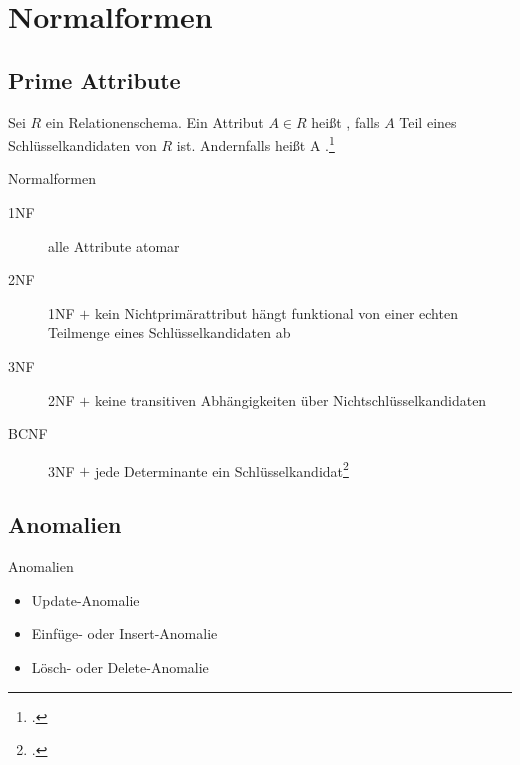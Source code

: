 \documentclass{lehramt-informatik-haupt}
\begin{document}
\let\ah=\liAttributHuelle
\let\m=\liAttributMenge
\let\FA=\liFunktionaleAbhaengigkeiten
\let\fa=\liFunktionaleAbhaengigkeit


\chapter{Normalformen}

\section{Prime Attribute}

Sei $R$ ein Relationenschema. Ein Attribut $A \in R$ heißt ,
falls $A$ Teil eines Schlüsselkandidaten von $R$ ist. Andernfalls heißt
A .\footcite[Seite 191]{winter}

\begin{liLernkartei}{Normalformen}
\begin{description}
\item[1NF] alle Attribute atomar

\item[2NF] 1NF $+$ kein Nichtprimärattribut hängt funktional von einer
echten Teilmenge eines Schlüsselkandidaten ab

\item[3NF] 2NF $+$ keine transitiven Abhängigkeiten über
Nichtschlüsselkandidaten

\item[BCNF] 3NF $+$ jede Determinante ein Schlüsselkandidat\footcite[Seite 179]{kemper}
\end{description}
\end{liLernkartei}

%

\section{Anomalien}

\begin{liLernkartei}{Anomalien}
\begin{itemize}
\item Update-Anomalie
\item Einfüge- oder Insert-Anomalie
\item Lösch- oder Delete-Anomalie
\end{itemize}
\end{liLernkartei}
\end{document}
